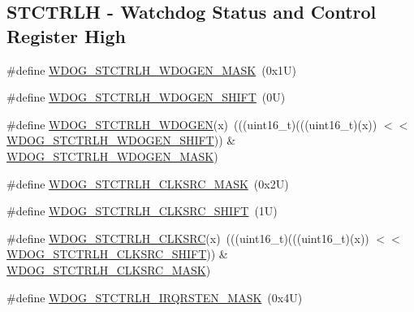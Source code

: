 \subsection*{S\+T\+C\+T\+R\+LH -\/ Watchdog Status and Control Register High}
\begin{DoxyCompactItemize}
\item 
\#define \mbox{\hyperlink{group___w_d_o_g___register___masks_ga4ca33884d6a6fed2670ba04150fbff3a}{W\+D\+O\+G\+\_\+\+S\+T\+C\+T\+R\+L\+H\+\_\+\+W\+D\+O\+G\+E\+N\+\_\+\+M\+A\+SK}}~(0x1\+U)
\item 
\#define \mbox{\hyperlink{group___w_d_o_g___register___masks_ga7d9c369fd8fe12905d3e4b2d94bfe9be}{W\+D\+O\+G\+\_\+\+S\+T\+C\+T\+R\+L\+H\+\_\+\+W\+D\+O\+G\+E\+N\+\_\+\+S\+H\+I\+FT}}~(0\+U)
\item 
\#define \mbox{\hyperlink{group___w_d_o_g___register___masks_gafb8eba17e7e2a718fbd11d13204ce95a}{W\+D\+O\+G\+\_\+\+S\+T\+C\+T\+R\+L\+H\+\_\+\+W\+D\+O\+G\+EN}}(x)~(((uint16\+\_\+t)(((uint16\+\_\+t)(x)) $<$$<$ \mbox{\hyperlink{group___w_d_o_g___register___masks_ga7d9c369fd8fe12905d3e4b2d94bfe9be}{W\+D\+O\+G\+\_\+\+S\+T\+C\+T\+R\+L\+H\+\_\+\+W\+D\+O\+G\+E\+N\+\_\+\+S\+H\+I\+FT}})) \& \mbox{\hyperlink{group___w_d_o_g___register___masks_ga4ca33884d6a6fed2670ba04150fbff3a}{W\+D\+O\+G\+\_\+\+S\+T\+C\+T\+R\+L\+H\+\_\+\+W\+D\+O\+G\+E\+N\+\_\+\+M\+A\+SK}})
\item 
\#define \mbox{\hyperlink{group___w_d_o_g___register___masks_gaf3ab71b185905c077887baa062ad6664}{W\+D\+O\+G\+\_\+\+S\+T\+C\+T\+R\+L\+H\+\_\+\+C\+L\+K\+S\+R\+C\+\_\+\+M\+A\+SK}}~(0x2\+U)
\item 
\#define \mbox{\hyperlink{group___w_d_o_g___register___masks_gaa437494e2c4bb2952986b89d4a52f2bf}{W\+D\+O\+G\+\_\+\+S\+T\+C\+T\+R\+L\+H\+\_\+\+C\+L\+K\+S\+R\+C\+\_\+\+S\+H\+I\+FT}}~(1\+U)
\item 
\#define \mbox{\hyperlink{group___w_d_o_g___register___masks_ga224fd323c11ba49b464f7caf2721af63}{W\+D\+O\+G\+\_\+\+S\+T\+C\+T\+R\+L\+H\+\_\+\+C\+L\+K\+S\+RC}}(x)~(((uint16\+\_\+t)(((uint16\+\_\+t)(x)) $<$$<$ \mbox{\hyperlink{group___w_d_o_g___register___masks_gaa437494e2c4bb2952986b89d4a52f2bf}{W\+D\+O\+G\+\_\+\+S\+T\+C\+T\+R\+L\+H\+\_\+\+C\+L\+K\+S\+R\+C\+\_\+\+S\+H\+I\+FT}})) \& \mbox{\hyperlink{group___w_d_o_g___register___masks_gaf3ab71b185905c077887baa062ad6664}{W\+D\+O\+G\+\_\+\+S\+T\+C\+T\+R\+L\+H\+\_\+\+C\+L\+K\+S\+R\+C\+\_\+\+M\+A\+SK}})
\item 
\#define \mbox{\hyperlink{group___w_d_o_g___register___masks_ga64ebb40c66318cac7631c3fd467c846a}{W\+D\+O\+G\+\_\+\+S\+T\+C\+T\+R\+L\+H\+\_\+\+I\+R\+Q\+R\+S\+T\+E\+N\+\_\+\+M\+A\+SK}}~(0x4\+U)

\end{DoxyCompactItemize}
